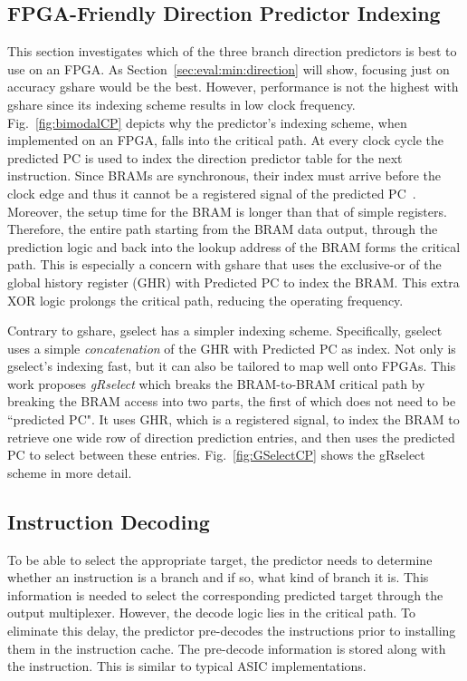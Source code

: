\subsection{FPGA-Friendly Direction Predictor Indexing}
\label{sec:min:fpga:indexing}
This section investigates which of the three branch direction predictors is best to use on an FPGA. As Section~\ref{sec:eval:min:direction} will show, focusing just on accuracy gshare would be the best. However, performance is not the highest with gshare since its indexing scheme results in low clock frequency. Fig.~\ref{fig:bimodalCP} depicts why the predictor's indexing scheme, when implemented on an FPGA, falls into the critical path. At every clock cycle the predicted PC is used to index the direction predictor table for the next instruction. Since BRAMs are synchronous, their index must arrive before the clock edge and thus it cannot be a registered signal of the predicted PC~\cite{StratixIVM9K}. Moreover, the setup time for the BRAM is longer than that of simple registers. Therefore, the entire path starting from the BRAM data output, through the prediction logic and back into the lookup address of the BRAM forms the critical path. This is especially a concern with gshare that uses the exclusive-or of the global history register (GHR) with Predicted PC to index the BRAM. This extra XOR logic prolongs the critical path, reducing the operating frequency.

Contrary to gshare, gselect has a simpler indexing scheme. Specifically, gselect uses a simple \textit{concatenation} of the GHR with Predicted PC as index. Not only is gselect's indexing fast, but it can also  be tailored to map well onto FPGAs. This work proposes \textit{gRselect} which breaks the BRAM-to-BRAM critical path by breaking the BRAM access into two parts, the first of which does not need to be ``predicted PC". It uses GHR, which is a registered signal, to index the BRAM to retrieve one wide row of direction prediction entries, and then uses the predicted PC to select between these entries. Fig.~\ref{fig:GSelectCP} shows the gRselect scheme in more detail.


\subsection{Instruction Decoding}
\label{sec:min:fpga:predecode}
To be able to select the appropriate target, the predictor needs to determine whether an instruction is a branch and if so, what kind of branch it is. This information is needed to select the corresponding predicted target through the output multiplexer. However, the decode logic lies in the critical path. To eliminate this delay, the predictor pre-decodes the instructions prior to installing them in the instruction cache. The pre-decode information is stored along with the instruction. This is similar to  typical ASIC implementations.

 



